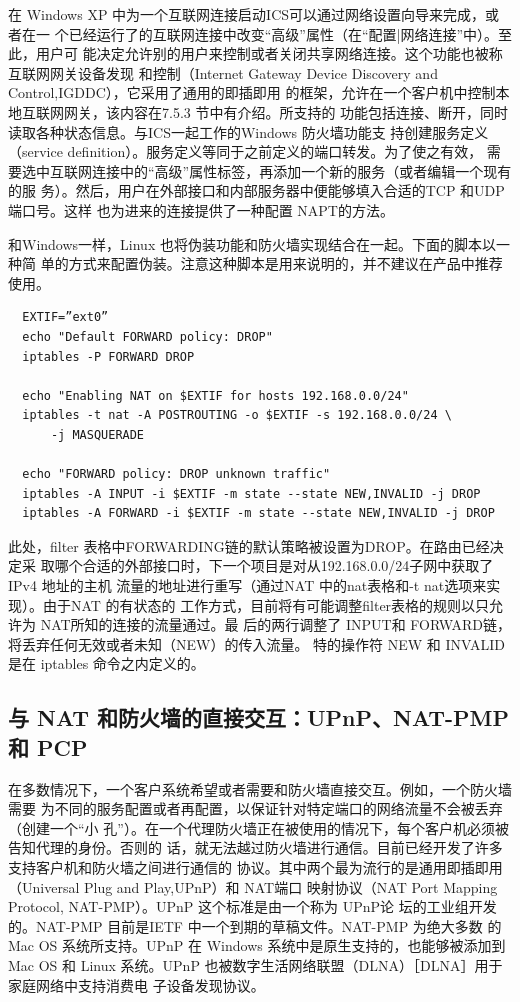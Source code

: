 在 Windows XP 中为一个互联网连接启动ICS可以通过网络设置向导来完成，或者在一
个已经运行了的互联网连接中改变“高级”属性（在“配置|网络连接”中）。至此，用户可
能决定允许别的用户来控制或者关闭共享网络连接。这个功能也被称互联网网关设备发现
和控制（Internet Gateway Device Discovery and Control,IGDDC），它采用了通用的即插即用
的框架，允许在一个客户机中控制本地互联网网关，该内容在7.5.3 节中有介绍。所支持的
功能包括连接、断开，同时读取各种状态信息。与ICS一起工作的Windows 防火墙功能支
持创建服务定义（service definition）。服务定义等同于之前定义的端口转发。为了使之有效，
需要选中互联网连接中的“高级”属性标签，再添加一个新的服务（或者编辑一个现有的服
务）。然后，用户在外部接口和内部服务器中便能够填入合适的TCP 和UDP端口号。这样
也为进来的连接提供了一种配置 NAPT的方法。

和Windows一样，Linux 也将伪装功能和防火墙实现结合在一起。下面的脚本以一种简
单的方式来配置伪装。注意这种脚本是用来说明的，并不建议在产品中推荐使用。

\begin{verbatim}
  EXTIF=”ext0”
  echo "Default FORWARD policy: DROP"
  iptables -P FORWARD DROP

  echo "Enabling NAT on $EXTIF for hosts 192.168.0.0/24"
  iptables -t nat -A POSTROUTING -o $EXTIF -s 192.168.0.0/24 \
      -j MASQUERADE

  echo "FORWARD policy: DROP unknown traffic"
  iptables -A INPUT -i $EXTIF -m state --state NEW,INVALID -j DROP
  iptables -A FORWARD -i $EXTIF -m state --state NEW,INVALID -j DROP
\end{verbatim}

此处，filter 表格中FORWARDING链的默认策略被设置为DROP。在路由已经决定采
取哪个合适的外部接口时，下一个项目是对从192.168.0.0/24子网中获取了IPv4 地址的主机
流量的地址进行重写（通过NAT 中的nat表格和-t nat选项来实现）。由于NAT 的有状态的
工作方式，目前将有可能调整filter表格的规则以只允许为 NAT所知的连接的流量通过。最
后的两行调整了 INPUT和 FORWARD链，将丢弃任何无效或者未知（NEW）的传入流量。
特的操作符 NEW 和 INVALID 是在 iptables 命令之内定义的。

\subsection{与 NAT 和防火墙的直接交互：UPnP、NAT-PMP 和 PCP}

在多数情况下，一个客户系统希望或者需要和防火墙直接交互。例如，一个防火墙需要
为不同的服务配置或者再配置，以保证针对特定端口的网络流量不会被丢弃（创建一个“小
孔”）。在一个代理防火墙正在被使用的情况下，每个客户机必须被告知代理的身份。否则的
话，就无法越过防火墙进行通信。目前已经开发了许多支持客户机和防火墙之间进行通信的
协议。其中两个最为流行的是通用即插即用（Universal Plug and Play,UPnP）和 NAT端口
映射协议（NAT Port Mapping Protocol, NAT-PMP）。UPnP 这个标准是由一个称为 UPnP论
坛的工业组开发的。NAT-PMP 目前是IETF 中一个到期的草稿文件。NAT-PMP 为绝大多数
的Mac OS 系统所支持。UPnP 在 Windows 系统中是原生支持的，也能够被添加到 Mac OS
和 Linux 系统。UPnP 也被数字生活网络联盟（DLNA）［DLNA］用于家庭网络中支持消费电
子设备发现协议。

